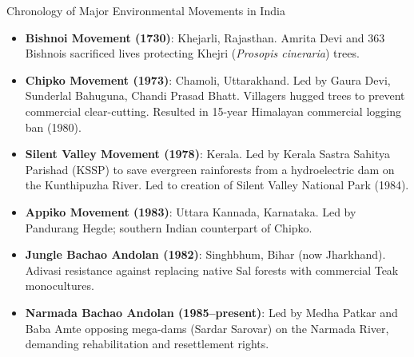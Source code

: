 \begin{lawbox}{Chronology of Major Environmental Movements in India}
\begin{itemize}[leftmargin=1.2em]
    \item \textbf{Bishnoi Movement (1730)}: Khejarli, Rajasthan. Amrita Devi and 363 Bishnois sacrificed lives protecting Khejri (\textit{Prosopis cineraria}) trees.
    \item \textbf{Chipko Movement (1973)}: Chamoli, Uttarakhand. Led by Gaura Devi, Sunderlal Bahuguna, Chandi Prasad Bhatt. Villagers hugged trees to prevent commercial clear-cutting. Resulted in 15-year Himalayan commercial logging ban (1980).
    \item \textbf{Silent Valley Movement (1978)}: Kerala. Led by Kerala Sastra Sahitya Parishad (KSSP) to save evergreen rainforests from a hydroelectric dam on the Kunthipuzha River. Led to creation of Silent Valley National Park (1984).
    \item \textbf{Appiko Movement (1983)}: Uttara Kannada, Karnataka. Led by Pandurang Hegde; southern Indian counterpart of Chipko.
    \item \textbf{Jungle Bachao Andolan (1982)}: Singhbhum, Bihar (now Jharkhand). Adivasi resistance against replacing native Sal forests with commercial Teak monocultures.
    \item \textbf{Narmada Bachao Andolan (1985--present)}: Led by Medha Patkar and Baba Amte opposing mega-dams (Sardar Sarovar) on the Narmada River, demanding rehabilitation and resettlement rights.
\end{itemize}
\end{lawbox}
